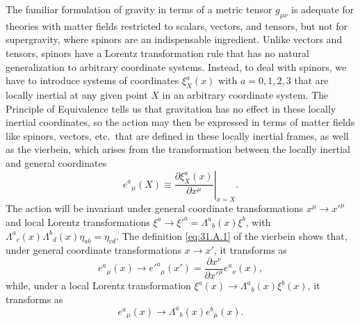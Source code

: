 

The familiar formulation of gravity in terms of a metric tensor
\(g_{\mu\nu}\) is adequate for theories with matter fields restricted to
scalars, vectors, and tensors, but not for supergravity, where spinors are
an indispensable ingredient. Unlike vectors and tensors, spinors have a
Lorentz transformation rule that has no natural generalization to
arbitrary coordinate systems. Instead, to deal with spinors, we have to
introduce systems of coordinates \(\xi_X^a(x)\) with \(a=0,1,2,3\) that
are locally inertial at any given point \(X\) in an arbitrary coordinate
system. The Principle of Equivalence tells us that gravitation has no
effect in these locally inertial coordinates, so the action may then be
expressed in terms of matter fields like spinors, vectors, etc.\ that are
defined in these locally inertial frames, as well as the vierbein, which
arises from the transformation between the locally inertial and general
coordinates
\begin{equation}
  e^a{}_\mu(X)
  \equiv
  \left.
    \frac{\partial\xi_X^a(x)}{\partial x^\mu}
  \right|_{x=X}.
  \tag{31.A.1}\label{eq:31.A.1}
\end{equation}
The action will be invariant under general coordinate transformations
\(x^\mu\longrightarrow x'^\mu\) and local Lorentz transformations
\(\xi^a\longrightarrow\xi'^a=\Lambda^a{}_b(x)\xi^b\), with
\(\Lambda^a{}_c(x)\Lambda^b{}_d(x)\eta_{ab}=\eta_{cd}\). The definition
\eqref{eq:31.A.1} of the vierbein shows that, under general coordinate
transformations \(x\longrightarrow x'\), it transforms as
\begin{equation}
  e^a{}_\mu(x)
  \longrightarrow
  e'^a{}_\mu(x')
  =\frac{\partial x^\nu}{\partial x'^\mu}e^a{}_\nu(x),
  \tag{31.A.2}\label{eq:31.A.2}
\end{equation}
while, under a local Lorentz transformation
\(\xi^a(x)\longrightarrow\Lambda^a{}_b(x)\xi^b(x)\), it transforms as
\begin{equation}
  e^a{}_\mu(x)
  \longrightarrow
  \Lambda^a{}_b(x)e^b{}_\mu(x).
  \tag{31.A.3}\label{eq:31.A.3}
\end{equation}

